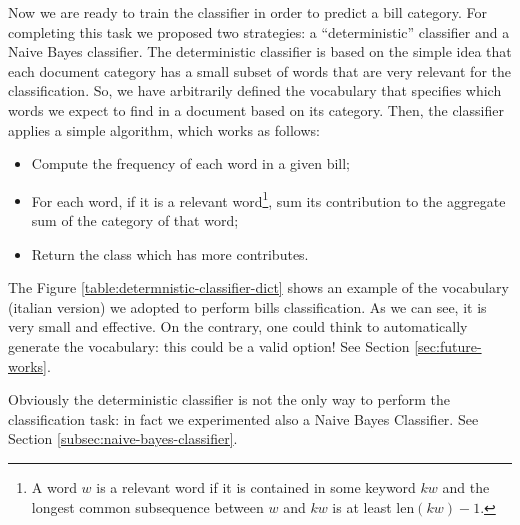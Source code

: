 \documentclass[10pt,twocolumn,letterpaper]{article}
\begin{document}
Now we are ready to train the classifier in order to predict a bill
category. For completing this task we proposed two strategies: a
``deterministic'' classifier and a Naive Bayes classifier. The
deterministic classifier is based on the simple idea that each
document category has a small subset of words that are very relevant
for the classification. So, we have arbitrarily defined the
vocabulary that specifies which words we expect to find in a document
based on its category. Then, the classifier applies a simple
algorithm, which works as follows:

\begin{itemize}
  \item Compute the frequency of each word in a given bill;
  \item For each word, if it is a relevant word\footnote{A word $w$ is
    a relevant word if it is contained in some keyword $kw$ and the
    longest common subsequence between $w$ and $kw$ is at least
    $\mathrm{len}(kw) - 1$.}, sum its contribution to the aggregate
    sum of the category of that word;
  \item Return the class which has more contributes.
\end{itemize}

The Figure \ref{table:determnistic-classifier-dict} shows an example
of the vocabulary (italian version) we adopted to perform bills
classification. As we can see, it is very small and effective.  On
the contrary, one could think to automatically generate the
vocabulary: this could be a valid option! See Section
\ref{sec:future-works}.

Obviously the deterministic classifier is not the only way to perform
the classification task: in fact we experimented also a Naive Bayes
Classifier. See Section \ref{subsec:naive-bayes-classifier}.
\end{document}
